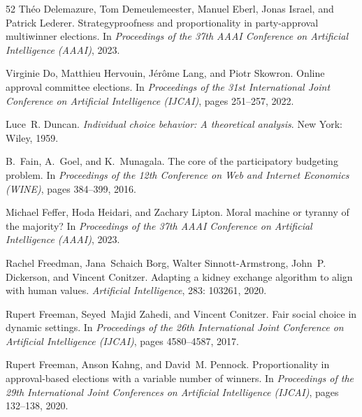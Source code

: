 \documentclass[10pt]{scrartcl}
\theoremstyle{plain}
\theoremstyle{definition}
\begin{document}
\begin{thebibliography}{52}
	Th{\'e}o Delemazure, Tom Demeulemeester, Manuel Eberl, Jonas Israel, and
	Patrick Lederer.
	\newblock Strategyproofness and proportionality in party-approval multiwinner
	elections.
	\newblock In \emph{Proceedings of the 37th AAAI Conference on Artificial
		Intelligence (AAAI)}, 2023.
	
	Virginie Do, Matthieu Hervouin, J{\'{e}}r{\^{o}}me Lang, and Piotr Skowron.
	\newblock Online approval committee elections.
	\newblock In \emph{Proceedings of the 31st International Joint Conference on
		Artificial Intelligence (IJCAI)}, pages 251--257, 2022.
	
	Luce~R. Duncan.
	\newblock \emph{Individual choice behavior: A theoretical analysis}.
	\newblock New York: Wiley, 1959.
	
	B.~Fain, A.~Goel, and K.~Munagala.
	\newblock The core of the participatory budgeting problem.
	\newblock In \emph{Proceedings of the 12th Conference on Web and Internet
		Economics (WINE)}, pages 384--399, 2016.
	
	Michael Feffer, Hoda Heidari, and Zachary Lipton.
	\newblock Moral machine or tyranny of the majority?
	\newblock In \emph{Proceedings of the 37th AAAI Conference on Artificial
		Intelligence (AAAI)}, 2023.
	
	Rachel Freedman, Jana~Schaich Borg, Walter Sinnott-Armstrong, John~P.
	Dickerson, and Vincent Conitzer.
	\newblock Adapting a kidney exchange algorithm to align with human values.
	\newblock \emph{Artificial Intelligence}, 283: 103261, 2020.
	
	Rupert Freeman, Seyed~Majid Zahedi, and Vincent Conitzer.
	\newblock Fair social choice in dynamic settings.
	\newblock In \emph{Proceedings of the 26th International Joint Conference on
		Artificial Intelligence (IJCAI)}, pages 4580--4587, 2017.
	
	Rupert Freeman, Anson Kahng, and David~M. Pennock.
	\newblock Proportionality in approval-based elections with a variable number of
	winners.
	\newblock In \emph{Proceedings of the 29th International Joint Conferences on
		Artificial Intelligence (IJCAI)}, pages 132--138, 2020.
	

\end{thebibliography}
\end{document}
